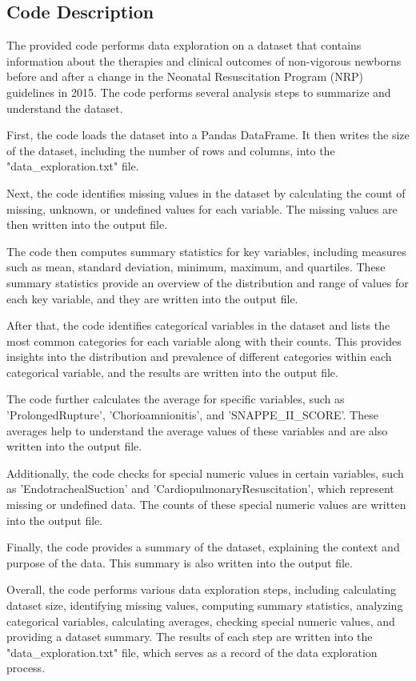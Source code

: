 \documentclass[11pt]{article}
\begin{document}
\subsection{Code Description}

The provided code performs data exploration on a dataset that contains information about the therapies and clinical outcomes of non-vigorous newborns before and after a change in the Neonatal Resuscitation Program (NRP) guidelines in 2015. The code performs several analysis steps to summarize and understand the dataset.

First, the code loads the dataset into a Pandas DataFrame. It then writes the size of the dataset, including the number of rows and columns, into the "data\_exploration.txt" file.

Next, the code identifies missing values in the dataset by calculating the count of missing, unknown, or undefined values for each variable. The missing values are then written into the output file.

The code then computes summary statistics for key variables, including measures such as mean, standard deviation, minimum, maximum, and quartiles. These summary statistics provide an overview of the distribution and range of values for each key variable, and they are written into the output file.

After that, the code identifies categorical variables in the dataset and lists the most common categories for each variable along with their counts. This provides insights into the distribution and prevalence of different categories within each categorical variable, and the results are written into the output file.

The code further calculates the average for specific variables, such as 'ProlongedRupture', 'Chorioamnionitis', and 'SNAPPE\_II\_SCORE'. These averages help to understand the average values of these variables and are also written into the output file.

Additionally, the code checks for special numeric values in certain variables, such as 'EndotrachealSuction' and 'CardiopulmonaryResuscitation', which represent missing or undefined data. The counts of these special numeric values are written into the output file.

Finally, the code provides a summary of the dataset, explaining the context and purpose of the data. This summary is also written into the output file.

Overall, the code performs various data exploration steps, including calculating dataset size, identifying missing values, computing summary statistics, analyzing categorical variables, calculating averages, checking special numeric values, and providing a dataset summary. The results of each step are written into the "data\_exploration.txt" file, which serves as a record of the data exploration process.
\end{document}
